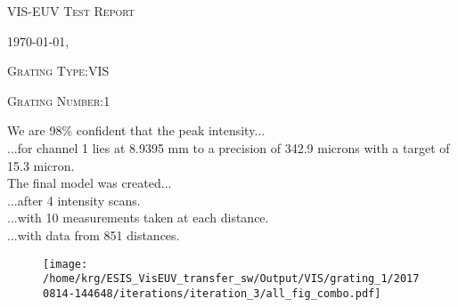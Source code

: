 \documentclass[12pt,a4paper]{article}
\begin{document}
\begin{center}
{\scshape\LARGE VIS-EUV Test Report \par}
{\scshape\Large \today, \currenttime \par}
\bigskip
{\scshape\large Grating Type:VIS \par}
{\scshape\large Grating Number:1 \par}
\end{center}
\noindent We are 98\% confident that the peak intensity...\\
\indent...for channel 1 lies at 8.9395 mm to a precision of 342.9 microns with a target of 15.3 micron.\\
\noindent The final model was created...\\
\indent...after 4 intensity scans.\\
\indent...with 10 measurements taken at each distance.\\
\indent...with data from 851 distances.\\
\begin{figure}[H]
\centering
\texttt{[image: /home/krg/ESIS\_VisEUV\_transfer\_sw/Output/VIS/grating\_1/20170814-144648/iterations/iteration\_3/all\_fig\_combo.pdf]}\\
\end{figure}
\end{document}
